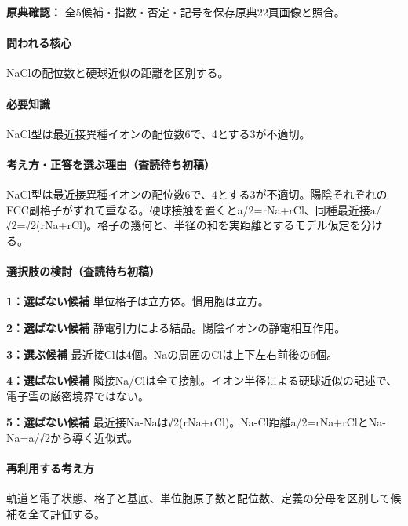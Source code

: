 \noindent\textbf{原典確認：} 全5候補・指数・否定・記号を保存原典22頁画像と照合。\par

\paragraph{問われる核心} NaClの配位数と硬球近似の距離を区別する。

\paragraph{必要知識} NaCl型は最近接異種イオンの配位数6で、4とする3が不適切。

\paragraph{考え方・正答を選ぶ理由（査読待ち初稿）} NaCl型は最近接異種イオンの配位数6で、4とする3が不適切。陽陰それぞれのFCC副格子がずれて重なる。硬球接触を置くとa/2=\allowbreak{}rNa+rCl、同種最近接a/√2=√2(rNa+rCl)。格子の幾何と、半径の和を実距離とするモデル仮定を分ける。

\paragraph{選択肢の検討（査読待ち初稿）}\mbox{}\par

\noindent\textbf{1：選ばない候補} 単位格子は立方体。慣用胞は立方。\par

\noindent\textbf{2：選ばない候補} 静電引力による結晶。陽陰イオンの静電相互作用。\par

\noindent\textbf{3：選ぶ候補} 最近接Clは4個。Naの周囲のClは上下左右前後の6個。\par

\noindent\textbf{4：選ばない候補} 隣接Na/Clは全て接触。イオン半径による硬球近似の記述で、電子雲の厳密境界ではない。\par

\noindent\textbf{5：選ばない候補} 最近接Na-Naは√2(rNa+rCl)。Na-Cl距離a/2=\allowbreak{}rNa+rClとNa-Na=\allowbreak{}a/√2から導く近似式。\par

\paragraph{再利用する考え方} 軌道と電子状態、格子と基底、単位胞原子数と配位数、定義の分母を区別して候補を全て評価する。

